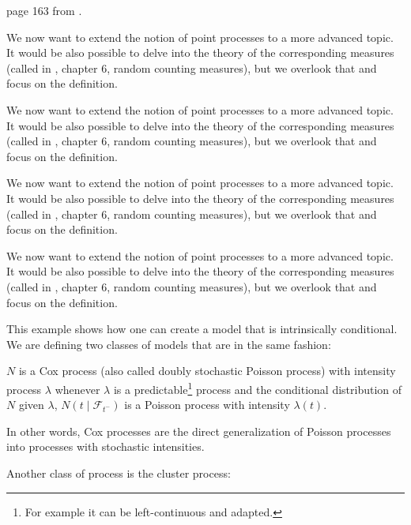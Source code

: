 \documentclass[11pt]{book}
\begin{document}
\begin{ajoutationV}{}{}
page 163 from \cite{daley}.


We now want to extend the notion of point processes to a more advanced topic. It would be also possible to delve into the theory of the corresponding measures (called in \cite{daley}, chapter 6, random counting measures), but we overlook that and focus on the definition.


We now want to extend the notion of point processes to a more advanced topic. It would be also possible to delve into the theory of the corresponding measures (called in \cite{daley}, chapter 6, random counting measures), but we overlook that and focus on the definition.

We now want to extend the notion of point processes to a more advanced topic. It would be also possible to delve into the theory of the corresponding measures (called in \cite{daley}, chapter 6, random counting measures), but we overlook that and focus on the definition.


We now want to extend the notion of point processes to a more advanced topic. It would be also possible to delve into the theory of the corresponding measures (called in \cite{daley}, chapter 6, random counting measures), but we overlook that and focus on the definition.
\end{ajoutationV}


This example shows how one can create a model that is intrinsically conditional. We are defining two classes of models that are in the same fashion:


\begin{definition}
$N$ is a Cox process (also called doubly stochastic Poisson process) with intensity process $\lambda$ whenever $\lambda$ is a predictable\footnote{For example it can be left-continuous and adapted.} process and the conditional distribution of $N$ given $\lambda$, $N(t \mid \mathcal F_{t^-})$ is a Poisson process with intensity $\lambda (t) $. 

In other words, Cox processes are the direct generalization of Poisson processes into processes with stochastic intensities.

\end{definition}

Another class of process is the cluster process:
\end{document}
